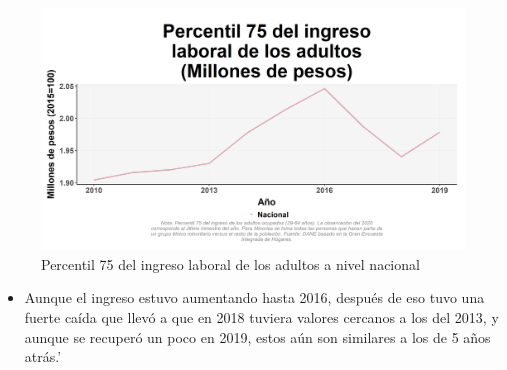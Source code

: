     \begin{figure}[H]
        \caption{Percentil 75 del ingreso laboral de los adultos a nivel nacional \label{map_result_2} }
        \begin{center}
        \includegraphics[width=\textwidth,keepaspectratio]{img/var_30_trend.png}
        \end{center}
    \end{figure}
            \begin{itemize}
                \item Aunque el ingreso estuvo aumentando hasta 2016, después de eso tuvo una fuerte caída que llevó a que en 2018 tuviera valores cercanos a los del 2013, y aunque se recuperó un poco en 2019, estos aún son similares a los de 5 años atrás.'
                \end{itemize}

